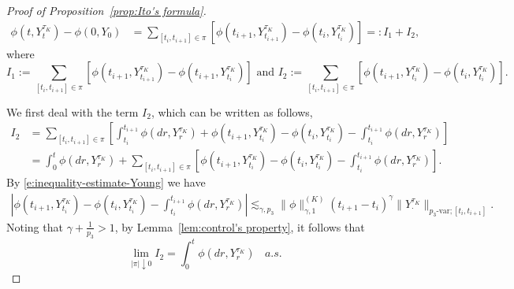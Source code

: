 \documentclass[10pt,a4paper]{amsart}
\begin{document}
\begin{proof}[Proof of Proposition~\ref{prop:Ito's formula}]
\begin{equation}\label{decomI}	
\begin{aligned}
\phi(t,Y^{\tau_{K}}_{t}) - \phi(0,Y_{0}) &= \sum_{[t_{i},t_{i+1}]\in \pi}\left[\phi(t_{i+1},Y^{\tau_{K}}_{t_{i+1}}) - \phi(t_{i},Y^{\tau_{K}}_{t_{i}})\right]  =: I_{1} + I_{2},
\end{aligned} 
\end{equation}
where \[I_{1} := \sum_{[t_{i},t_{i+1}]\in\pi}\left[\phi(t_{i+1},Y^{\tau_{K}}_{t_{i+1}}) - \phi(t_{i+1},Y^{\tau_{K}}_{t_{i}})\right]  \text{ and } I_{2} := \sum_{[t_{i},t_{i+1}]\in\pi}\left[\phi(t_{i+1},Y^{\tau_{K}}_{t_{i}}) - \phi(t_{i},Y^{\tau_{K}}_{t_{i}})\right]
.\]

We first deal with the term $I_{2}$, which can be written as	follows,	
\begin{equation*}
\begin{aligned}
I_{2} & = \sum_{[t_{i},t_{i+1}]\in\pi} \left[\int_{t_{i}}^{t_{i+1}}\phi(dr,Y^{\tau_{K}}_{r}) + \phi(t_{i+1},Y^{\tau_{K}}_{t_{i}}) - \phi(t_{i},Y^{\tau_{K}}_{t_{i}}) - \int_{t_{i}}^{t_{i+1}}\phi(dr,Y^{\tau_{K}}_{r})\right]\\
& = \int_{0}^{t}\phi(dr,Y^{\tau_{K}}_{r}) +\sum_{[t_{i},t_{i+1}]\in\pi}\left[ \phi(t_{i+1},Y^{\tau_{K}}_{t_{i}}) - \phi(t_{i},Y^{\tau_{K}}_{t_{i}}) - \int_{t_{i}}^{t_{i+1}}\phi(dr,Y^{\tau_{K}}_{r})\right].
\end{aligned}
\end{equation*}
By \eqref{e:inequality-estimate-Young} we have 	
\begin{align*}	
\left|\phi(t_{i+1},Y^{\tau_{K}}_{t_{i}}) - \phi(t_{i},Y^{\tau_{K}}_{t_{i}}) - \int_{t_{i}}^{t_{i+1}}\phi(dr,Y^{\tau_{K}}_{r})\right| \lesssim_{\gamma,p_{3}} \|\phi\|^{(K)}_{\gamma,1}(t_{i+1}-t_{i})^{\gamma} \|Y^{\tau_{K}}_{\cdot}\|_{p_{3}\text{-var};[t_{i},t_{i+1}]}.
\end{align*}
Noting that $\gamma + \frac{1}{p_{3}}>1$, by Lemma~\ref{lem:control's property}, it follows that
\begin{equation}\label{e:I2}
\lim_{|\pi|\downarrow 0} I_{2} = \int_{0}^{t}\phi(dr,Y^{\tau_{K}}_{r})\ \ \ \ a.s.	
\end{equation}


\end{proof}
\end{document}
